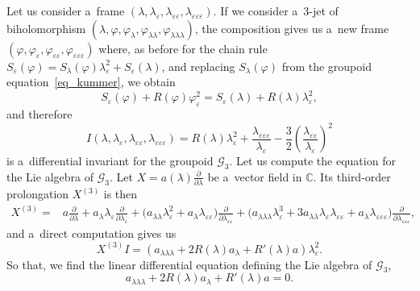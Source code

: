 \documentclass[10pt,a4paper]{amsart}
\numberwithin{equation}{section}
\theoremstyle{definition}
\begin{document}
Let us consider a~frame $(\lambda,\lambda_\varepsilon,\lambda_{\varepsilon\varepsilon},\lambda_{\varepsilon\varepsilon\varepsilon})$. If we consider a~$3$-jet of biholomorphism $(\lambda,\varphi,\varphi_\lambda,\allowbreak \varphi_{\lambda\lambda},\varphi_{\lambda\lambda\lambda})$, the composition gives us a~new frame $(\varphi,\varphi_\varepsilon,\varphi_{\varepsilon\varepsilon},\varphi_{\varepsilon\varepsilon\varepsilon})$ where, as before for the chain rule
$
S_{\varepsilon}(\varphi) = S_{\lambda}(\varphi) \lambda_{\varepsilon}^2 + S_\varepsilon(\lambda)$,
and replacing $S_{\lambda}(\varphi)$ from the groupoid equation~\eqref{eq_kummer}, we obtain
\[
S_{\varepsilon}(\varphi) + R(\varphi)\varphi_\varepsilon^2 = S_{\varepsilon}(\lambda) + R(\lambda)\lambda_\varepsilon^2,
\]
and therefore
\begin{equation}\label{eq_invariant}
I(\lambda,\lambda_{\varepsilon},\lambda_{\varepsilon\varepsilon},\lambda_{\varepsilon\varepsilon\varepsilon}) = R(\lambda)\lambda_\varepsilon^2 + \frac{\lambda_{\varepsilon\varepsilon\varepsilon}}{\lambda_\varepsilon} - \frac{3}{2}
\left(\frac{\lambda_{\varepsilon\varepsilon}}{\lambda_\varepsilon}\right)^2
\end{equation}
is a~differential invariant for the groupoid $\mathcal G_3$. Let us compute the equation for the Lie algebra of $\mathcal G_3$. Let $X = a(\lambda)\frac{\partial}{\partial \lambda}$ be a~vector field in $\mathbb C$. Its third-order prolongation $X^{(3)}$ is then
\begin{align*}%
X^{(3)} ={} & a\frac{\partial}{\partial \lambda} + a_\lambda\lambda_\varepsilon\frac{\partial}{\partial \lambda_\varepsilon}+
\bigl(a_{\lambda\lambda} \lambda_\varepsilon^2 + a_\lambda \lambda_{\varepsilon\varepsilon}\bigr)\frac{\partial}{\partial \lambda_{\varepsilon\varepsilon}}
+ \bigl(a_{\lambda\lambda\lambda}\lambda_\varepsilon^3 + 3a_{\lambda\lambda}\lambda_\varepsilon\lambda_{\varepsilon\varepsilon}
+ a_\lambda\lambda_{\varepsilon\varepsilon\varepsilon} \bigr) \frac{\partial}{\partial \lambda_{\varepsilon\varepsilon\varepsilon}},
\end{align*}
and a~direct computation gives us
\[
X^{(3)}I = (a_{\lambda\lambda\lambda} + 2R(\lambda) a_{\lambda} + R'(\lambda)a)\lambda_\varepsilon^2.
\]
So that, we find the linear differential equation defining the Lie algebra of $\mathcal G_3$,
\begin{equation}\label{eq_sym2}
 a_{\lambda\lambda\lambda} + 2R(\lambda)a_{\lambda} + R'(\lambda)a = 0.
\end{equation}
\end{document}
